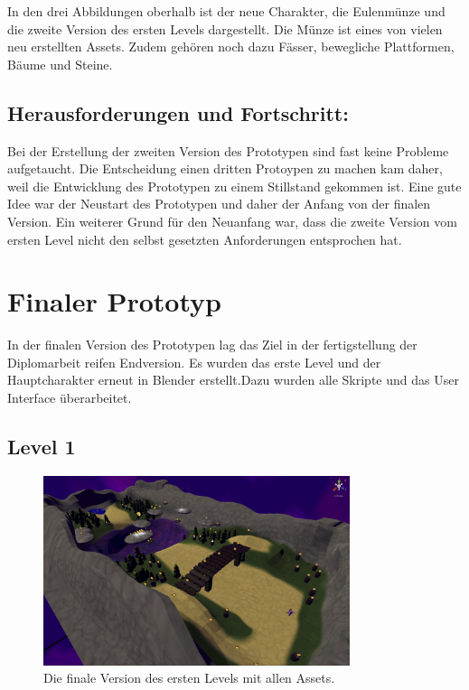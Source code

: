 In den drei Abbildungen oberhalb ist der neue Charakter, die Eulenmünze und die zweite Version des ersten Levels dargestellt. Die Münze ist eines von vielen neu erstellten Assets. Zudem gehören noch dazu Fässer, bewegliche Plattformen, Bäume und Steine.
\pagebreak

\subsection{Herausforderungen und Fortschritt:}

Bei der Erstellung der zweiten Version des Prototypen sind fast keine Probleme aufgetaucht. Die Entscheidung einen dritten Protoypen zu machen kam daher, weil die Entwicklung des Prototypen zu einem Stillstand gekommen ist. Eine gute Idee war der Neustart des Prototypen und daher der Anfang von der finalen Version. Ein weiterer Grund für den Neuanfang war, dass die zweite Version vom ersten Level nicht den selbst gesetzten Anforderungen entsprochen hat.  

\pagebreak

\section{Finaler Prototyp}

In der finalen Version des Prototypen lag das Ziel in der fertigstellung der Diplomarbeit reifen Endversion. Es wurden das erste Level und der Hauptcharakter erneut in Blender erstellt.Dazu wurden alle Skripte und das User Interface überarbeitet. 

\subsection{Level 1}

\begin{figure}[h]
  \centering
  \includegraphics*[width=0.8\textwidth]{chapters/04/images/V3/Level1.png}
  \caption{Die finale Version des ersten Levels mit allen Assets.}
  \label{fig:PE08}
\end{figure}

